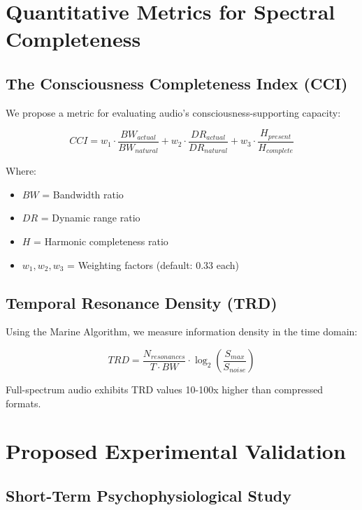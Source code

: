 \documentclass[12pt,a4paper]{article}
\begin{document}
\section{Quantitative Metrics for Spectral Completeness}

\subsection{The Consciousness Completeness Index (CCI)}

We propose a metric for evaluating audio's consciousness-supporting capacity:

\begin{equation}
CCI = w_1 \cdot \frac{BW_{actual}}{BW_{natural}} + w_2 \cdot \frac{DR_{actual}}{DR_{natural}} + w_3 \cdot \frac{H_{present}}{H_{complete}}
\end{equation}

Where:
\begin{itemize}
\item $BW$ = Bandwidth ratio
\item $DR$ = Dynamic range ratio
\item $H$ = Harmonic completeness ratio
\item $w_1, w_2, w_3$ = Weighting factors (default: 0.33 each)
\end{itemize}

\subsection{Temporal Resonance Density (TRD)}

Using the Marine Algorithm, we measure information density in the time domain:

\begin{equation}
TRD = \frac{N_{resonances}}{T \cdot BW} \cdot \log_2\left(\frac{S_{max}}{S_{noise}}\right)
\end{equation}

Full-spectrum audio exhibits TRD values 10-100x higher than compressed formats.

\section{Proposed Experimental Validation}

\subsection{Short-Term Psychophysiological Study}
\end{document}
